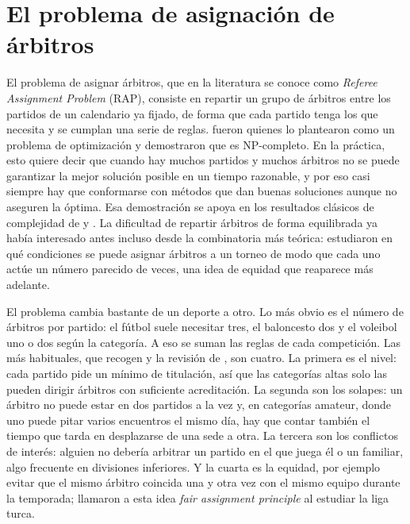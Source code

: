 \documentclass[11pt,a4paper,spanish]{book}
\numberwithin{equation}{chapter}
\numberwithin{figure}{chapter}
\numberwithin{table}{chapter}
\begin{document}
\section{El problema de asignación de árbitros}
\label{sec:rap}

El problema de asignar árbitros, que en la literatura se conoce como \emph{Referee Assignment Problem} (RAP), consiste en repartir un grupo de árbitros entre los partidos de un calendario ya fijado, de forma que cada partido tenga los que necesita y se cumplan una serie de reglas.  fueron quienes lo plantearon como un problema de optimización y demostraron que es NP-completo. En la práctica, esto quiere decir que cuando hay muchos partidos y muchos árbitros no se puede garantizar la mejor solución posible en un tiempo razonable, y por eso casi siempre hay que conformarse con métodos que dan buenas soluciones aunque no aseguren la óptima. Esa demostración se apoya en los resultados clásicos de complejidad de  y . La dificultad de repartir árbitros de forma equilibrada ya había interesado antes incluso desde la combinatoria más teórica:  estudiaron en qué condiciones se puede asignar árbitros a un torneo de modo que cada uno actúe un número parecido de veces, una idea de equidad que reaparece más adelante.

El problema cambia bastante de un deporte a otro. Lo más obvio es el número de árbitros por partido: el fútbol suele necesitar tres, el baloncesto dos y el voleibol uno o dos según la categoría. A eso se suman las reglas de cada competición. Las más habituales, que recogen  y la revisión de , son cuatro. La primera es el nivel: cada partido pide un mínimo de titulación, así que las categorías altas solo las pueden dirigir árbitros con suficiente acreditación. La segunda son los solapes: un árbitro no puede estar en dos partidos a la vez y, en categorías amateur, donde uno puede pitar varios encuentros el mismo día, hay que contar también el tiempo que tarda en desplazarse de una sede a otra. La tercera son los conflictos de interés: alguien no debería arbitrar un partido en el que juega él o un familiar, algo frecuente en divisiones inferiores. Y la cuarta es la equidad, por ejemplo evitar que el mismo árbitro coincida una y otra vez con el mismo equipo durante la temporada;  llamaron a esta idea \emph{fair assignment principle} al estudiar la liga turca.
\end{document}
